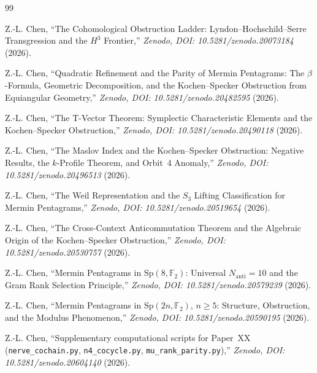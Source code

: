 \documentclass[11pt,a4paper]{article}
\theoremstyle{remark}
\newcommand{\Sp}{\mathrm{Sp}}
\begin{document}
\begin{thebibliography}{99}

Z.-L. Chen,
``The Cohomological Obstruction Ladder: 
Lyndon–Hochschild–Serre Transgression and the $H^3$ Frontier,''
\textit{Zenodo, DOI: 10.5281/zenodo.20073184} (2026).

Z.-L. Chen,
``Quadratic Refinement and the Parity of Mermin Pentagrams:
The $\beta$-Formula, Geometric Decomposition, and the
Kochen--Specker Obstruction from Equiangular Geometry,''
\textit{Zenodo, DOI: 10.5281/zenodo.20482595} (2026).

Z.-L. Chen,
``The T-Vector Theorem: Symplectic Characteristic Elements
and the Kochen--Specker Obstruction,''
\textit{Zenodo, DOI: 10.5281/zenodo.20490118} (2026).

Z.-L. Chen,
``The Maslov Index and the Kochen--Specker Obstruction:
Negative Results, the $k$-Profile Theorem, and Orbit~4 Anomaly,''
\textit{Zenodo, DOI: 10.5281/zenodo.20496513} (2026).

Z.-L. Chen,
``The Weil Representation and the $S_3$ Lifting Classification
for Mermin Pentagrams,''
\textit{Zenodo, DOI: 10.5281/zenodo.20519654} (2026).

Z.-L. Chen,
``The Cross-Context Anticommutation Theorem
and the Algebraic Origin of the Kochen--Specker Obstruction,''
\textit{Zenodo, DOI: 10.5281/zenodo.20530757} (2026).

Z.-L. Chen,
``Mermin Pentagrams in $\Sp(8,\mathbb{F}_2)$:
Universal $N_{\mathrm{anti}}=10$ and the Gram Rank Selection Principle,''
\textit{Zenodo, DOI: 10.5281/zenodo.20579239} (2026).

Z.-L. Chen,
``Mermin Pentagrams in $\Sp(2n,\mathbb{F}_2)$, $n\ge5$:
Structure, Obstruction, and the Modulus Phenomenon,''
\textit{Zenodo, DOI: 10.5281/zenodo.20590195} (2026).

Z.-L. Chen,
``Supplementary computational scripts for Paper~XX
(\texttt{nerve\_cochain.py}, \texttt{n4\_cocycle.py},
\texttt{mu\_rank\_parity.py}),''
\textit{Zenodo, DOI: 10.5281/zenodo.20604140} (2026).

\end{thebibliography}
\end{document}
